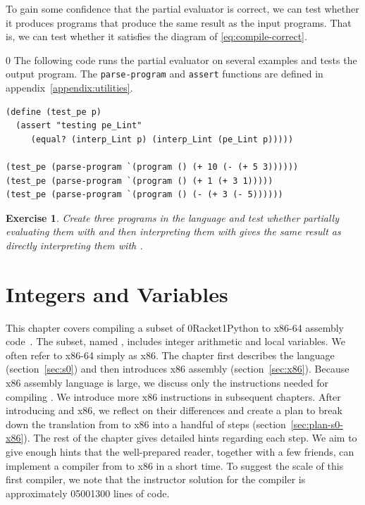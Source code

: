\documentclass[7x10]{TimesAPriori_MIT}%
\def\racketEd{0}
\def\pythonEd{1}
\def\edition{0}
\newcommand{\racket}[1]{{\if\edition\racketEd{#1}\fi}}
\newcommand{\python}[1]{{\if\edition\pythonEd #1\fi}}
\newtheorem{exercise}[theorem]{Exercise}
\numberwithin{theorem}{chapter}
\numberwithin{definition}{chapter}
\numberwithin{equation}{chapter}
\begin{document}
To gain some confidence that the partial evaluator is correct, we can
test whether it produces programs that produce the same result as the
input programs. That is, we can test whether it satisfies the diagram
of \eqref{eq:compile-correct}.
%
{\if\edition\racketEd
The following code runs the partial evaluator on several examples and
tests the output program.  The \texttt{parse-program} and
\texttt{assert} functions are defined in
appendix~\ref{appendix:utilities}.\\
\begin{minipage}{1.0\textwidth}
\begin{lstlisting}
(define (test_pe p)
  (assert "testing pe_Lint"
     (equal? (interp_Lint p) (interp_Lint (pe_Lint p)))))

(test_pe (parse-program `(program () (+ 10 (- (+ 5 3))))))
(test_pe (parse-program `(program () (+ 1 (+ 3 1)))))
(test_pe (parse-program `(program () (- (+ 3 (- 5))))))
\end{lstlisting}
\end{minipage}
\fi}

\begin{exercise}\normalfont\normalsize
  Create three programs in the \LangInt{} language and test whether
  partially evaluating them with  and then
  interpreting them with  gives the same result
  as directly interpreting them with .
\end{exercise}


\chapter{Integers and Variables}
\label{ch:Lvar}
\setcounter{footnote}{0}

This chapter covers compiling a subset of
\racket{Racket}\python{Python} to x86-64 assembly
code~\citep{Intel:2015aa}. The subset, named \LangVar{}, includes
integer arithmetic and local variables.  We often refer to x86-64
simply as x86.  The chapter first describes the \LangVar{} language
(section~\ref{sec:s0}) and then introduces x86 assembly
(section~\ref{sec:x86}). Because x86 assembly language is large, we
discuss only the instructions needed for compiling \LangVar{}. We
introduce more x86 instructions in subsequent chapters.  After
introducing \LangVar{} and x86, we reflect on their differences and
create a plan to break down the translation from \LangVar{} to x86
into a handful of steps (section~\ref{sec:plan-s0-x86}).  The rest of
the chapter gives detailed hints regarding each step.  We aim to give
enough hints that the well-prepared reader, together with a few
friends, can implement a compiler from \LangVar{} to x86 in a short
time.  To suggest the scale of this first compiler, we note that the
instructor solution for the \LangVar{} compiler is approximately
\racket{500}\python{300} lines of code.
\end{document}
